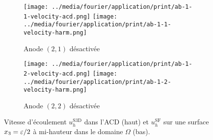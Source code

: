\begin{figure}[h!]
  \begin{center}
    \begin{subfigure}[t]{\textwidth}
      \begin{center}
        \texttt{[image: ../media/fourier/application/print/ab-1-1-velocity-acd.png]}
        \texttt{[image: ../media/fourier/application/print/ab-1-1-velocity-harm.png]}
        \caption{Anode $(2,1)$ désactivée}
        \label{fig:}
      \end{center}
    \end{subfigure}

    \begin{subfigure}[t]{\textwidth}
      \begin{center}
        \texttt{[image: ../media/fourier/application/print/ab-1-2-velocity-acd.png]}
        \texttt{[image: ../media/fourier/application/print/ab-1-2-velocity-harm.png]}
        \caption{Anode $(2,2)$ désactivée}
        \label{fig:}
      \end{center}
    \end{subfigure}


    \caption{Vitesse d'écoulement $u_h^\mathrm{S3D}$ dans l'ACD (haut)
      et $u_h^\mathrm{SF}$ sur une surface $x_3 = \varepsilon / 2$ à
      mi-hauteur dans le domaine $\Omega$ (bas).}

    \label{fig:harmonic-velocity-comp-b}
  \end{center}
\end{figure}

